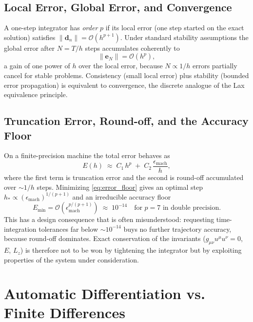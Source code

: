 \documentclass[11pt]{book}
\begin{document}
\subsection{Local Error, Global Error, and Convergence}
A one-step integrator has \emph{order} $p$ if its local error (one step started on the
exact solution) satisfies $\|\bm{d}_n\| = \mathcal{O}(h^{p+1})$. Under standard
stability assumptions the global error after $N = T/h$ steps accumulates coherently to
\begin{equation}
    \|\bm{e}_N\| = \mathcal{O}(h^p),
\end{equation}
a gain of one power of $h$ over the local error, because $N \propto 1/h$ errors partially
cancel for stable problems. Consistency (small local error) plus stability
(bounded error propagation) is equivalent to convergence, the discrete analogue of
the Lax equivalence principle.

\subsection{Truncation Error, Round-off, and the Accuracy Floor}
On a finite-precision machine the total error behaves as
\begin{equation}\label{eq:error_floor}
    E(h) \;\approx\; C_1\, h^{p} \;+\; C_2\, \frac{\epsilon_{\mathrm{mach}}}{h},
\end{equation}
where the first term is truncation error and the second is round-off accumulated over
 $\sim 1/h$ steps. Minimizing \eqref{eq:error_floor} gives an optimal step
 $h_* \propto (\epsilon_{\mathrm{mach}})^{1/(p+1)}$ and an irreducible accuracy floor
\begin{equation}
    E_{\min} = \mathcal{O}\!\left(\epsilon_{\mathrm{mach}}^{p/(p+1)}\right)
    \;\approx\; 10^{-14} \quad \text{for } p = 7 \text{ in double precision}.
\end{equation}
This has a design consequence that is often misunderstood: requesting time-integration
tolerances far below $\sim 10^{-14}$ buys no further trajectory accuracy, because
round-off dominates. Exact conservation of the invariants
($g_{\mu\nu}u^\mu u^\nu = 0$, $E$, $L_z$) is therefore not to be won by tightening the
integrator but by exploiting properties of the system under consideration.

\section{Automatic Differentiation vs. Finite Differences}
\end{document}

